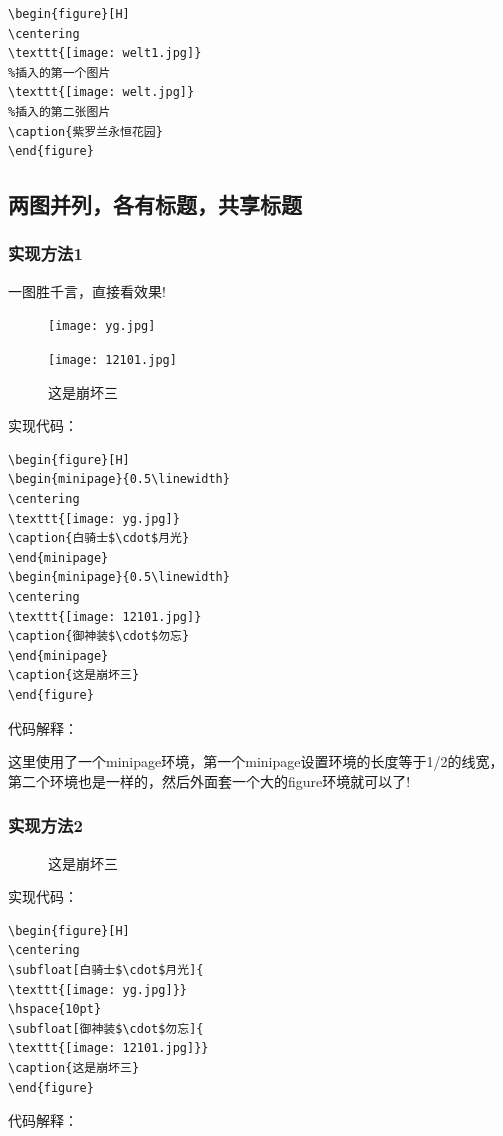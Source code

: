 \documentclass[cn,chinese,color=cyan]{elegantbook}
\begin{document}
\begin{lstlisting}[style=R]
\begin{figure}[H]
\centering
\texttt{[image: welt1.jpg]}
%插入的第一个图片
\texttt{[image: welt.jpg]}
%插入的第二张图片
\caption{紫罗兰永恒花园}
\end{figure}
\end{lstlisting}


\subsection{两图并列，各有标题，共享标题}
\subsubsection{实现方法1}
一图胜千言，直接看效果!
\begin{figure}[H]
	\begin{minipage}{0.5\linewidth}
		\centering
		\texttt{[image: yg.jpg]}
		\caption{白骑士$\cdot$月光}
	\end{minipage}	
	\begin{minipage}{0.5\linewidth}
		\centering
		\texttt{[image: 12101.jpg]}
		\caption{御神装$\cdot$勿忘}
	\end{minipage}	
	\caption{这是崩坏三}
\end{figure}
实现代码：
\begin{lstlisting}[style=R]
\begin{figure}[H]
\begin{minipage}{0.5\linewidth}
\centering
\texttt{[image: yg.jpg]}
\caption{白骑士$\cdot$月光}
\end{minipage}	
\begin{minipage}{0.5\linewidth}
\centering
\texttt{[image: 12101.jpg]}
\caption{御神装$\cdot$勿忘}
\end{minipage}	
\caption{这是崩坏三}
\end{figure}
\end{lstlisting}
代码解释：

这里使用了一个minipage环境，第一个minipage设置环境的长度等于1/2的线宽，第二个环境也是一样的，然后外面套一个大的figure环境就可以了!

\subsubsection{实现方法2}
\begin{figure}[H]
	\centering
	\hspace{10pt}
	\caption{这是崩坏三}
\end{figure}
实现代码：
\begin{lstlisting}[style=R]
\begin{figure}[H]
\centering
\subfloat[白骑士$\cdot$月光]{
\texttt{[image: yg.jpg]}}
\hspace{10pt}
\subfloat[御神装$\cdot$勿忘]{
\texttt{[image: 12101.jpg]}}
\caption{这是崩坏三}
\end{figure}
\end{lstlisting}
代码解释：
\end{document}
